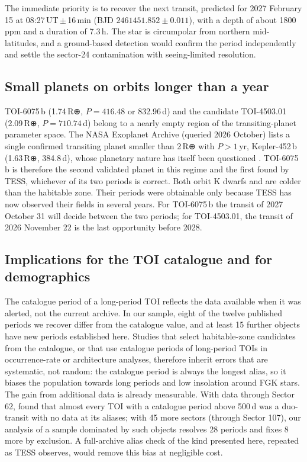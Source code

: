 \documentclass[fleqn,usenatbib]{mnras}
\begin{document}
The immediate priority is to recover the next transit, predicted for 2027 February 15 at 08:27\,UT\,$\pm$\,16\,min (BJD $2461451.852 \pm 0.011$), with a depth of about 1800\,ppm and a duration of 7.3\,h. The star is circumpolar from northern mid-latitudes, and a ground-based detection would confirm the period independently and settle the sector-24 contamination with seeing-limited resolution.

\subsection{Small planets on orbits longer than a year}

TOI-6075\,b (1.74\,R⊕, $P = 416.48$ or 832.96\,d) and the candidate TOI-4503.01 (2.09\,R⊕, $P = 710.74$\,d) belong to a nearly empty region of the transiting-planet parameter space. The NASA Exoplanet Archive (queried 2026 October) lists a single confirmed transiting planet smaller than 2\,R⊕ with $P > 1$\,yr, Kepler-452\,b (1.63\,R⊕, 384.8\,d), whose planetary nature has itself been questioned \citep{Mullally2018}. TOI-6075\,b is therefore the second validated planet in this regime and the first found by TESS, whichever of its two periods is correct. Both orbit K dwarfs and are colder than the habitable zone. Their periods were obtainable only because TESS has now observed their fields in several years. For TOI-6075\,b the transit of 2027 October 31 will decide between the two periods; for TOI-4503.01, the transit of 2026 November 22 is the last opportunity before 2028.

\subsection{Implications for the TOI catalogue and for demographics}

The catalogue period of a long-period TOI reflects the data available when it was alerted, not the current archive. In our sample, eight of the twelve published periods we recover differ from the catalogue value, and at least 15 further objects have new periods established here. Studies that select habitable-zone candidates from the catalogue, or that use catalogue periods of long-period TOIs in occurrence-rate or architecture analyses, therefore inherit errors that are systematic, not random: the catalogue period is always the longest alias, so it biases the population towards long periods and low insolation around FGK stars. The gain from additional data is already measurable. With data through Sector 62, \citet{Bass2025} found that almost every TOI with a catalogue period above 500\,d was a duo-transit with no data at its aliases; with 45 more sectors (through Sector 107), our analysis of a sample dominated by such objects resolves 28 periods and fixes 8 more by exclusion. A full-archive alias check of the kind presented here, repeated as TESS observes, would remove this bias at negligible cost.
\end{document}
